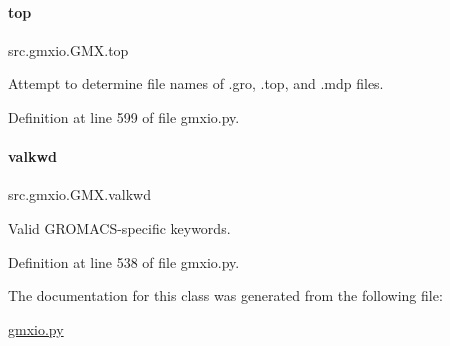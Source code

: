 \paragraph{\texorpdfstring{top}{top}}
{\footnotesize\ttfamily src.\+gmxio.\+G\+M\+X.\+top}



Attempt to determine file names of .gro, .top, and .mdp files. 



Definition at line 599 of file gmxio.\+py.

\mbox{\label{classsrc_1_1gmxio_1_1GMX_a73bfdd122081f5fa7bd1b969f8c0992b}} 
\paragraph{\texorpdfstring{valkwd}{valkwd}}
{\footnotesize\ttfamily src.\+gmxio.\+G\+M\+X.\+valkwd}



Valid G\+R\+O\+M\+A\+C\+S-\/specific keywords. 



Definition at line 538 of file gmxio.\+py.



The documentation for this class was generated from the following file\+:\begin{DoxyCompactItemize}
\item 
\hyperlink{gmxio_8py}{gmxio.\+py}\end{DoxyCompactItemize}
